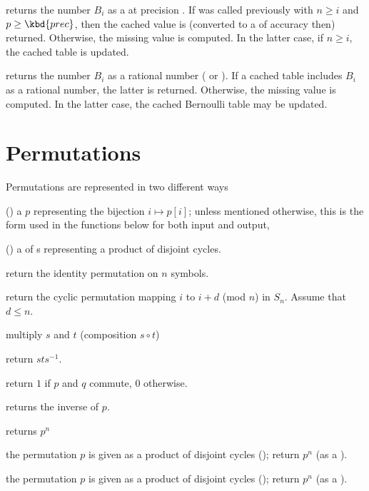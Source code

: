  returns the  number
$B_i$ as a  at precision . If  was called previously with $n \geq i$ and $p \geq \kbd{prec}$, then
the cached value is (converted to a  of accuracy  then)
returned. Otherwise, the missing value is computed. In the latter case,
if $n \geq i$, the cached table is updated.

 returns the  number $B_i$ as a
rational number ( or ). If a cached table includes $B_i$
as a rational number, the latter is returned. Otherwise, the missing value is
computed. In the latter case, the cached Bernoulli table may be updated.

\section{Permutations }

\noindent Permutations are represented in two different ways

\item () a  $p$ representing the bijection $i\mapsto
p[i]$; unless mentioned otherwise, this is the form used in the functions
below for both input and output,

\item () a  of s representing a product of
disjoint cycles.

 return the identity permutation on $n$
symbols.

 return the cyclic permutation mapping
$i$ to $i+d$ (mod $n$) in $S_n$. Assume that $d \leq n$.

 multiply $s$ and $t$ (composition $s\circ t$)

 return $sts^{-1}$.

 return $1$ if $p$ and $q$ commute, 0
otherwise.

 returns the inverse of $p$.

 returns $p^n$

 the permutation $p$ is given as
a product of disjoint cycles (); return $p^n$ (as a ).

 the permutation $p$ is given as
a product of disjoint cycles (); return $p^n$ (as a ).

